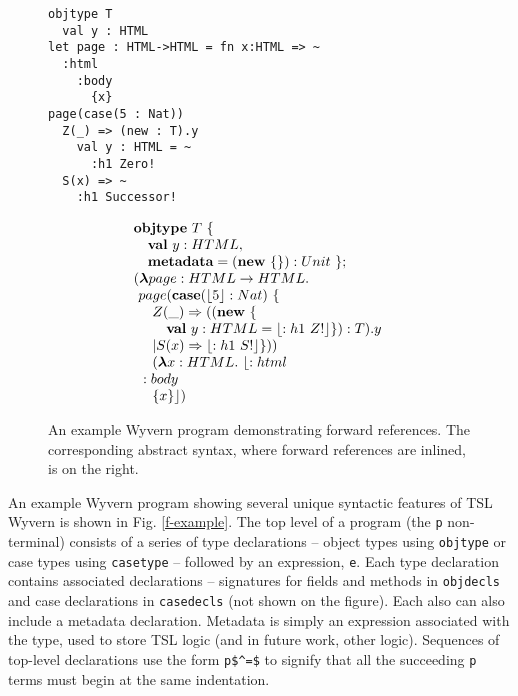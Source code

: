\begin{figure}[t]
\begin{minipage}[t]{.54\textwidth}
\begin{lstlisting}
objtype T
  val y : HTML
let page : HTML->HTML = fn x:HTML => ~
  :html
    :body
      {x}
page(case(5 : Nat))
  Z(_) => (new : T).y
    val y : HTML = ~
      :h1 Zero!
  S(x) => ~
    :h1 Successor!
\end{lstlisting}
\end{minipage}%
\begin{minipage}[t]{.45\textwidth}
 \centering
\[
\begin{array}{l}
\textbf{objtype} \ T\ \{ \\
  ~~~\textbf{val}\ y : HTML, \\
  ~~~\textbf{metadata} = (\textbf{new}\ \{\}) : Unit\ \}; \\
  (\boldsymbol\lambda page : HTML \rightarrow HTML.\\
  ~page(\textbf{case}(\lfloor 5 \rfloor : Nat)\ \{ \\
  ~~~~Z(\_) \Rightarrow ((\textbf{new}\ \{ \\
    ~~~~~~~\textbf{val}\ y : HTML = \lfloor :h1\ Z! \rfloor\}) : T).y\ \\
   ~~~~| S(x) \Rightarrow \lfloor :h1\ S! \rfloor\})) \\
  ~~~~(\boldsymbol\lambda x : HTML.\ \lfloor :html \\
    ~~:body \\
      ~~~~\{x\} \rfloor)
\end{array}
\]
\end{minipage}
\caption{An example Wyvern program demonstrating forward references. The corresponding abstract syntax, where forward references are inlined, is on the right.}
\label{fig:fwd-ref}
\vspace{-10px}
\end{figure}
An example Wyvern program showing several unique syntactic features of TSL Wyvern is shown in Fig. \ref{f-example}. The top level of a program (the \lstinline{p} non-terminal) consists of a series of type declarations -- object types using \lstinline{objtype} or case types using \lstinline{casetype} -- followed by an expression, \lstinline{e}. Each type declaration contains associated declarations -- signatures for fields and methods in  \lstinline{objdecls} and case declarations in \lstinline{casedecls} (not shown on the figure). Each also can also include a metadata declaration. Metadata is simply an expression associated with the type, used to store TSL logic (and in future work, other logic). Sequences of top-level declarations use the form \lstinline{p$^=$} to signify that all the succeeding \lstinline{p} terms must begin at the same indentation.

